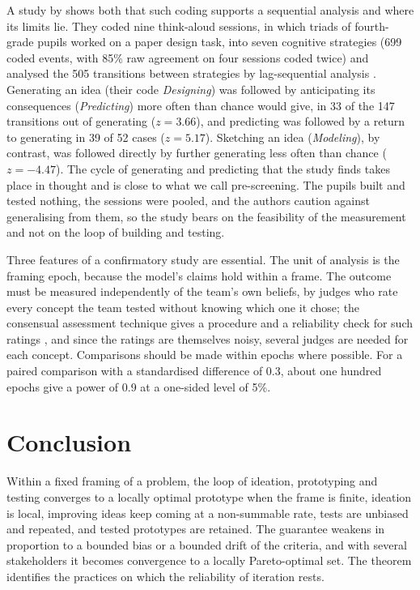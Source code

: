 \documentclass[10pt,twocolumn]{article}
\theoremstyle{definition}
\begin{document}
A study by \citet{sung2019} shows both that such coding supports a sequential analysis and where its limits lie. They coded nine think-aloud sessions, in which triads of fourth-grade pupils worked on a paper design task, into seven cognitive strategies (699 coded events, with 85\% raw agreement on four sessions coded twice) and analysed the 505 transitions between strategies by lag-sequential analysis \citep{bakeman2011}. Generating an idea (their code \emph{Designing}) was followed by anticipating its consequences (\emph{Predicting}) more often than chance would give, in 33 of the 147 transitions out of generating ($z=3.66$), and predicting was followed by a return to generating in 39 of 52 cases ($z=5.17$). Sketching an idea (\emph{Modeling}), by contrast, was followed directly by further generating less often than chance ($z=-4.47$). The cycle of generating and predicting that the study finds takes place in thought and is close to what we call pre-screening. The pupils built and tested nothing, the sessions were pooled, and the authors caution against generalising from them, so the study bears on the feasibility of the measurement and not on the loop of building and testing.

Three features of a confirmatory study are essential. The unit of analysis is the framing epoch, because the model's claims hold within a frame. The outcome must be measured independently of the team's own beliefs, by judges who rate every concept the team tested without knowing which one it chose; the consensual assessment technique gives a procedure and a reliability check for such ratings \citep{amabile1982}, and since the ratings are themselves noisy, several judges are needed for each concept. Comparisons should be made within epochs where possible. For a paired comparison with a standardised difference of 0.3, about one hundred epochs give a power of 0.9 at a one-sided level of 5\%.

\section{Conclusion}

Within a fixed framing of a problem, the loop of ideation, prototyping and testing converges to a locally optimal prototype when the frame is finite, ideation is local, improving ideas keep coming at a non-summable rate, tests are unbiased and repeated, and tested prototypes are retained. The guarantee weakens in proportion to a bounded bias or a bounded drift of the criteria, and with several stakeholders it becomes convergence to a locally Pareto-optimal set. The theorem identifies the practices on which the reliability of iteration rests.
\end{document}
